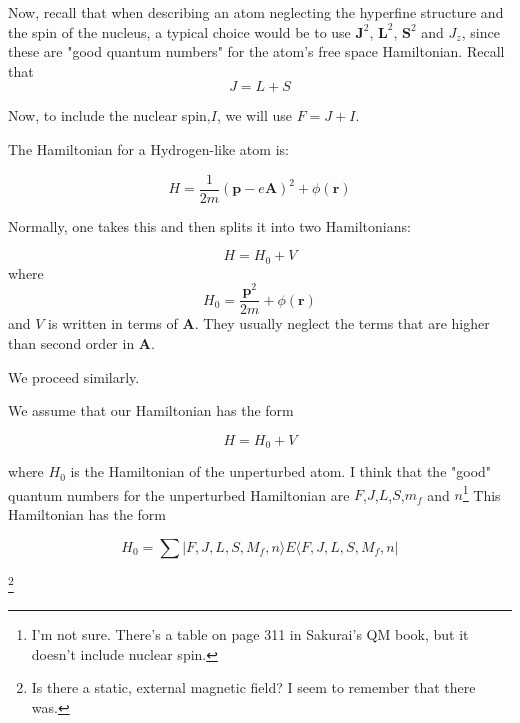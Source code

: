 Now, recall that when describing an atom neglecting the hyperfine structure and the spin of the nucleus, a typical choice would be to use $\mathbf{J}^2$, $\mathbf{L}^2$, $\mathbf{S}^2$ and $J_z$, since these are "good quantum numbers" for the atom's free space Hamiltonian. Recall that 
\begin{equation}
J=L+S
\end{equation}

Now, to include the nuclear spin,$I$, we will use $F=J+I$. 

The Hamiltonian for a Hydrogen-like atom is: 

\begin{equation}
H=\frac{1}{2m}(\mathbf{p}-e\mathbf{A})^2+\phi(\mathbf{r})
\end{equation}

Normally, one takes this and then splits it into two Hamiltonians: 

\begin{equation}
H=H_0+V
\end{equation}
where 
\begin{equation}
H_0=\frac{\mathbf{p}^2}{2m}+\phi(\mathbf{r})
\end{equation}
and $V$ is written in terms of $\mathbf{A}$. They usually neglect the terms that are higher than second order in $\mathbf{A}$.

We proceed similarly. 

We assume that our Hamiltonian has the form 

\begin{equation}
H=H_0+V
\end{equation}

where $H_0$ is the Hamiltonian of the unperturbed atom. I think that the "good" quantum numbers for the unperturbed Hamiltonian are $F$,$J$,$L$,$S$,$m_f$ and $n$\footnote{I'm not sure. There's a table on page 311 in Sakurai's QM book, but it doesn't include nuclear spin.} This Hamiltonian has the form 

\begin{equation}
H_0=\sum |F,J,L,S,M_f,n\rangle E \langle F,J,L,S,M_f,n|
\end{equation}

\footnote{Is there a static, external magnetic field? I seem to remember that there was.}




